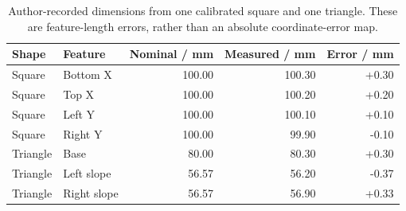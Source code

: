 \begin{table}[!htbp]\centering\small
\begin{tabular}{llrrr}\toprule
\textbf{Shape} & \textbf{Feature} & \textbf{Nominal / mm} & \textbf{Measured / mm} & \textbf{Error / mm}\\\midrule
Square & Bottom X & 100.00 & 100.30 & +0.30\\
Square & Top X & 100.00 & 100.20 & +0.20\\
Square & Left Y & 100.00 & 100.10 & +0.10\\
Square & Right Y & 100.00 & 99.90 & -0.10\\
Triangle & Base & 80.00 & 80.30 & +0.30\\
Triangle & Left slope & 56.57 & 56.20 & -0.37\\
Triangle & Right slope & 56.57 & 56.90 & +0.33\\
\bottomrule\end{tabular}
\caption{Author-recorded dimensions from one calibrated square and one triangle. These are feature-length errors, rather than an absolute coordinate-error map.}\label{tab:res-r5-lengths}
\end{table}
